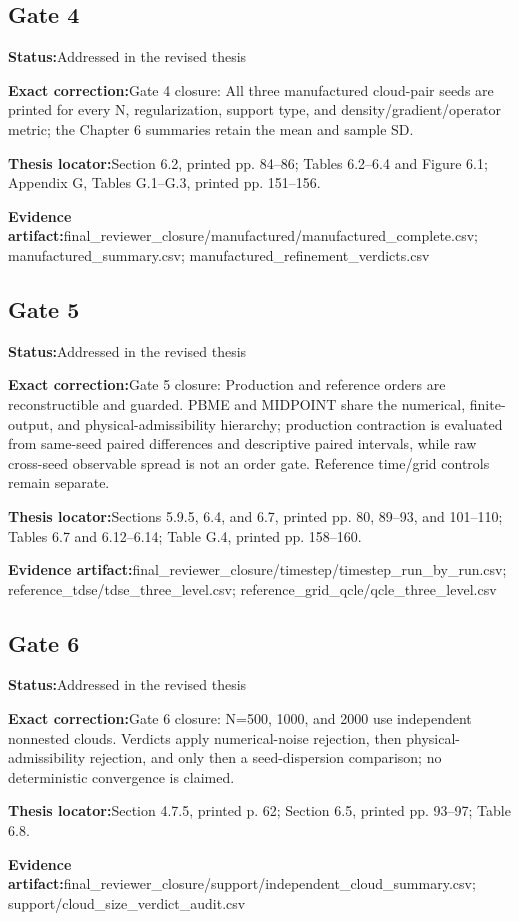 \documentclass[11pt]{article}
\newcommand{\field}[2]{\textbf{#1}\quad #2\par}
\begin{document}
\subsection*{Gate 4}
\field{Status:}{Addressed in the revised thesis}
\field{Exact correction:}{Gate 4 closure: All three manufactured cloud-pair seeds are printed for every N, regularization, support type, and density/gradient/operator metric; the Chapter 6 summaries retain the mean and sample SD.}
\field{Thesis locator:}{Section 6.2, printed pp. 84--86; Tables 6.2--6.4 and Figure 6.1; Appendix G, Tables G.1--G.3, printed pp. 151--156.}
\field{Evidence artifact:}{final\_reviewer\_closure/manufactured/manufactured\_complete.csv; manufactured\_summary.csv; manufactured\_refinement\_verdicts.csv}
\subsection*{Gate 5}
\field{Status:}{Addressed in the revised thesis}
\field{Exact correction:}{Gate 5 closure: Production and reference orders are reconstructible and guarded. PBME and MIDPOINT share the numerical, finite-output, and physical-admissibility hierarchy; production contraction is evaluated from same-seed paired differences and descriptive paired intervals, while raw cross-seed observable spread is not an order gate. Reference time/grid controls remain separate.}
\field{Thesis locator:}{Sections 5.9.5, 6.4, and 6.7, printed pp. 80, 89--93, and 101--110; Tables 6.7 and 6.12--6.14; Table G.4, printed pp. 158--160.}
\field{Evidence artifact:}{final\_reviewer\_closure/timestep/timestep\_run\_by\_run.csv; reference\_tdse/tdse\_three\_level.csv; reference\_grid\_qcle/qcle\_three\_level.csv}
\subsection*{Gate 6}
\field{Status:}{Addressed in the revised thesis}
\field{Exact correction:}{Gate 6 closure: N=500, 1000, and 2000 use independent nonnested clouds. Verdicts apply numerical-noise rejection, then physical-admissibility rejection, and only then a seed-dispersion comparison; no deterministic convergence is claimed.}
\field{Thesis locator:}{Section 4.7.5, printed p. 62; Section 6.5, printed pp. 93--97; Table 6.8.}
\field{Evidence artifact:}{final\_reviewer\_closure/support/independent\_cloud\_summary.csv; support/cloud\_size\_verdict\_audit.csv}
\end{document}
